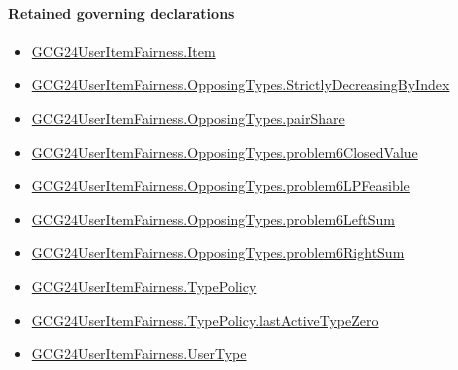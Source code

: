 \documentclass[10pt]{article}
\begin{document}
\paragraph{Retained governing declarations}
\begin{itemize}\raggedright
\item \hyperlink{governing-declaration-a7c560a429c6e204}{GCG24\allowbreak{}User\allowbreak{}Item\allowbreak{}Fairness.\allowbreak{}Item}
\item \hyperlink{governing-declaration-8278344d2ddef9a8}{GCG24\allowbreak{}User\allowbreak{}Item\allowbreak{}Fairness.\allowbreak{}Opposing\allowbreak{}Types.\allowbreak{}Strictly\allowbreak{}Decreasing\allowbreak{}By\allowbreak{}Index}
\item \hyperlink{governing-declaration-1663e30d856ccba9}{GCG24\allowbreak{}User\allowbreak{}Item\allowbreak{}Fairness.\allowbreak{}Opposing\allowbreak{}Types.\allowbreak{}pair\allowbreak{}Share}
\item \hyperlink{governing-declaration-4e57748e908ff1bf}{GCG24\allowbreak{}User\allowbreak{}Item\allowbreak{}Fairness.\allowbreak{}Opposing\allowbreak{}Types.\allowbreak{}problem6\allowbreak{}Closed\allowbreak{}Value}
\item \hyperlink{governing-declaration-1b64167397f5ef5d}{GCG24\allowbreak{}User\allowbreak{}Item\allowbreak{}Fairness.\allowbreak{}Opposing\allowbreak{}Types.\allowbreak{}problem6\allowbreak{}LP\allowbreak{}Feasible}
\item \hyperlink{governing-declaration-51a25da114143a5c}{GCG24\allowbreak{}User\allowbreak{}Item\allowbreak{}Fairness.\allowbreak{}Opposing\allowbreak{}Types.\allowbreak{}problem6\allowbreak{}Left\allowbreak{}Sum}
\item \hyperlink{governing-declaration-251df2cbc0502b5e}{GCG24\allowbreak{}User\allowbreak{}Item\allowbreak{}Fairness.\allowbreak{}Opposing\allowbreak{}Types.\allowbreak{}problem6\allowbreak{}Right\allowbreak{}Sum}
\item \hyperlink{governing-declaration-dc7776cb642fa9dc}{GCG24\allowbreak{}User\allowbreak{}Item\allowbreak{}Fairness.\allowbreak{}Type\allowbreak{}Policy}
\item \hyperlink{governing-declaration-8a85b9f21510683a}{GCG24\allowbreak{}User\allowbreak{}Item\allowbreak{}Fairness.\allowbreak{}Type\allowbreak{}Policy.\allowbreak{}last\allowbreak{}Active\allowbreak{}Type\allowbreak{}Zero}
\item \hyperlink{governing-declaration-fd2c25ccc96ab645}{GCG24\allowbreak{}User\allowbreak{}Item\allowbreak{}Fairness.\allowbreak{}User\allowbreak{}Type}
\end{itemize}
\end{document}
